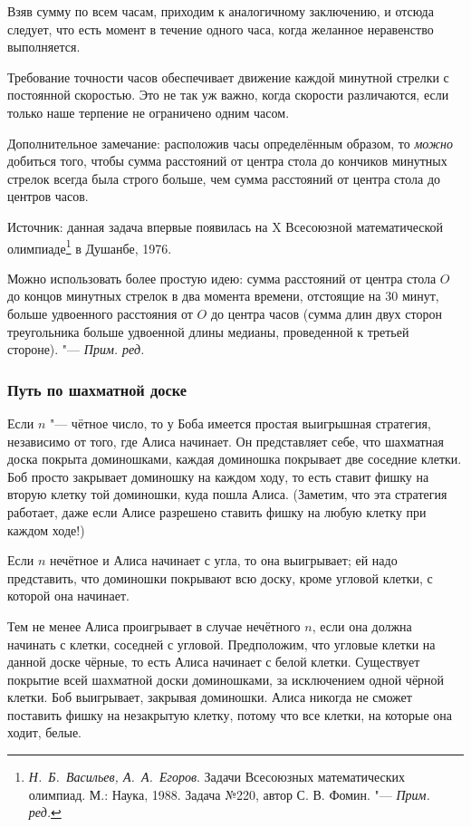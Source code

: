 \documentclass[twoside]{book}
\newcommand\VsMO{\emph{Н.~Б.~Васильев, А.~А.~Егоров}. Задачи Всесоюзных математических олимпиад. М.: Наука, 1988}
\newenvironment{addedbytheeditors}{\par\medskip\small
}{\par\addvspace{\medskipamount}} %
\begin{document}
Взяв сумму по всем часам, приходим к аналогичному заключению, и отсюда следует, что есть момент в течение одного часа, когда желанное неравенство выполняется.\heart


\medskip

Требование точности часов обеспечивает движение каждой минутной стрелки с постоянной скоростью.
Это не так уж важно, когда скорости различаются, если только наше терпение не ограничено одним часом.

Дополнительное замечание: расположив часы определённым образом,
то \emph{можно} добиться того, чтобы сумма расстояний от центра стола до кончиков минутных стрелок всегда была строго больше, чем сумма расстояний от центра стола до центров часов.


{%
Источник: данная задача впервые появилась на X Всесоюзной математической олимпиаде\footnote{%
\VsMO. Задача №220, автор С. В. Фомин. "--- \emph{Прим. ред.}} в Душанбе, 1976. 
}

\begin{addedbytheeditors}
Можно использовать более простую идею: сумма расстояний от центра
стола $O$ до концов минутных стрелок в два момента времени, отстоящие
на 30 минут, больше удвоенного расстояния от $O$ до центра часов
(сумма длин двух сторон треугольника больше удвоенной длины медианы,
проведенной к третьей стороне). "--- \emph{Прим. ред.}
\end{addedbytheeditors}


\subsubsection*{Путь по шахматной доске} %

Если $n$ "--- чётное число, то у Боба имеется простая выигрышная стратегия, независимо от того, где Алиса начинает.
Он представляет себе, что шахматная доска  покрыта доминошками, каждая доминошка покрывает две соседние клетки.
Боб просто закрывает доминошку на каждом ходу, то есть ставит фишку на вторую клетку той доминошки, куда пошла Алиса.
(Заметим, что эта стратегия работает, даже если Алисе разрешено ставить фишку на любую клетку при каждом ходе!)

Если $n$ нечётное и Алиса начинает с угла, то она выигрывает;
ей надо представить, что доминошки покрывают всю доску, кроме угловой клетки, с которой она начинает.

Тем не менее Алиса проигрывает в случае нечётного $n$, если она должна начинать с клетки, соседней с угловой.
Предположим, что угловые клетки на данной доске чёрные, то есть Алиса начинает с белой клетки.
Существует покрытие всей шахматной доски доминошками, за исключением одной чёрной клетки.
Боб выигрывает, закрывая доминошки.
Алиса
никогда не сможет поставить фишку на незакрытую клетку, потому что все клетки, на которые она ходит, белые.\heart
{\par}
\end{document}
